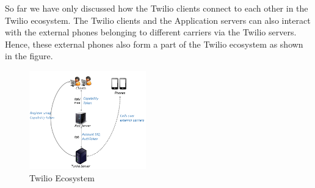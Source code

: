 So far we have only discussed how the Twilio clients connect to each other in the Twilio ecosystem. The Twilio clients and the Application servers can also interact with the external phones belonging to different carriers via the Twilio servers. Hence, these external phones also form a part of the Twilio ecosystem as shown in the figure.

\begin{figure}
\centering
  \centering
  \includegraphics[width=0.45\textwidth]{figs/Ecosystem.png}
\caption{Twilio Ecosystem}
\label{fig:ecosystem}
\end{figure}     



